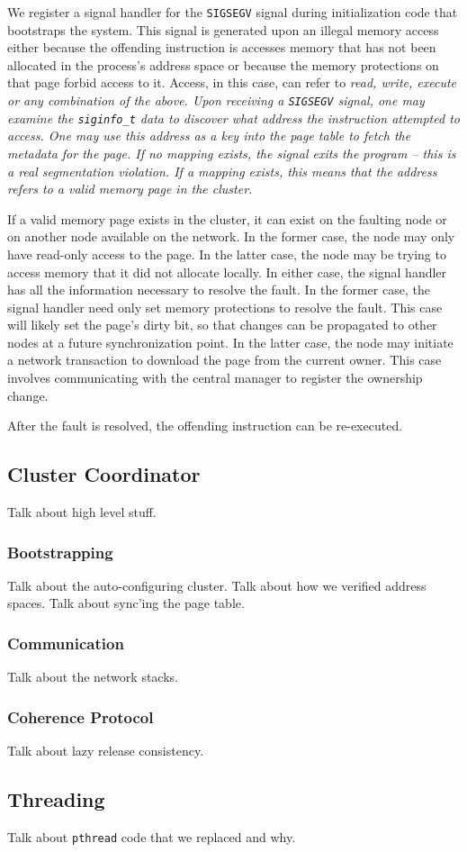 We register a signal handler for the \verb,SIGSEGV, signal during initialization code that bootstraps the \projname{} system.  This signal is generated upon an illegal memory access either because the offending instruction is accesses memory that has not been allocated in the process's address space or because the memory protections on that page forbid access to it.  Access, in this case, can refer to \em read\em, \em write\em, \em execute \em or any combination of the above.  Upon receiving a \verb,SIGSEGV, signal, one may examine the \verb,siginfo_t, data to discover what address the instruction attempted to access.  One may use this address as a key into the page table to fetch the metadata for the page.  If no mapping exists, the signal exits the program -- this is a real segmentation violation.  If a mapping exists, this means that the address refers to a valid memory page in the cluster.

If a valid memory page exists in the cluster, it can exist on the faulting node or on another node available on the network.  In the former case, the node may only have read-only access to the page.  In the latter case, the node may be trying to access memory that it did not allocate locally.  In either case, the signal handler has all the information necessary to resolve the fault.  In the former case, the signal handler need only set memory protections to resolve the fault.  This case will likely set the page's dirty bit, so that changes can be propagated to other nodes at a future synchronization point.  In the latter case, the node may initiate a network transaction to download the page from the current owner.  This case involves communicating with the central manager to register the ownership change.

After the fault is resolved,  the offending instruction can be re-executed.

\subsection{Cluster Coordinator}
\label{cluster-coordinator}

Talk about high level stuff.

\subsubsection{Bootstrapping}
Talk about the auto-configuring cluster.  Talk about how we verified address spaces.  Talk about sync'ing the page table.

\subsubsection{Communication}
Talk about the network stacks.

\subsubsection{Coherence Protocol}
Talk about lazy release consistency.

\subsection{Threading}
Talk about \verb,pthread, code that we replaced and why. 